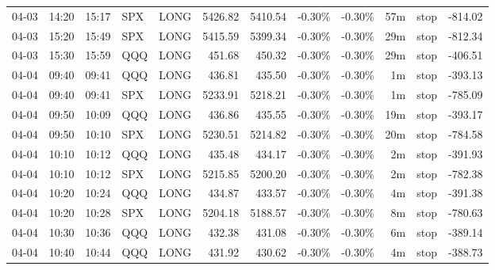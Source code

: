 \documentclass[11pt,a4paper,twoside]{article}
\begin{document}
\begin{center}
\begin{longtable}{>{\color{txtmain}}l l l l l r r r r r >{\color{txtmain}}l r}
04-03 & 14:20 & 15:17 & SPX & LONG & 5426.82 & 5410.54 & \textcolor{lossred}{-0.30\%} & \textcolor{lossred}{-0.30\%} & 57m & stop & \textcolor{lossred}{-814.02} \\
04-03 & 15:20 & 15:49 & SPX & LONG & 5415.59 & 5399.34 & \textcolor{lossred}{-0.30\%} & \textcolor{lossred}{-0.30\%} & 29m & stop & \textcolor{lossred}{-812.34} \\
04-03 & 15:30 & 15:59 & QQQ & LONG & 451.68 & 450.32 & \textcolor{lossred}{-0.30\%} & \textcolor{lossred}{-0.30\%} & 29m & stop & \textcolor{lossred}{-406.51} \\
04-04 & 09:40 & 09:41 & QQQ & LONG & 436.81 & 435.50 & \textcolor{lossred}{-0.30\%} & \textcolor{lossred}{-0.30\%} & 1m & stop & \textcolor{lossred}{-393.13} \\
04-04 & 09:40 & 09:41 & SPX & LONG & 5233.91 & 5218.21 & \textcolor{lossred}{-0.30\%} & \textcolor{lossred}{-0.30\%} & 1m & stop & \textcolor{lossred}{-785.09} \\
04-04 & 09:50 & 10:09 & QQQ & LONG & 436.86 & 435.55 & \textcolor{lossred}{-0.30\%} & \textcolor{lossred}{-0.30\%} & 19m & stop & \textcolor{lossred}{-393.17} \\
04-04 & 09:50 & 10:10 & SPX & LONG & 5230.51 & 5214.82 & \textcolor{lossred}{-0.30\%} & \textcolor{lossred}{-0.30\%} & 20m & stop & \textcolor{lossred}{-784.58} \\
04-04 & 10:10 & 10:12 & QQQ & LONG & 435.48 & 434.17 & \textcolor{lossred}{-0.30\%} & \textcolor{lossred}{-0.30\%} & 2m & stop & \textcolor{lossred}{-391.93} \\
04-04 & 10:10 & 10:12 & SPX & LONG & 5215.85 & 5200.20 & \textcolor{lossred}{-0.30\%} & \textcolor{lossred}{-0.30\%} & 2m & stop & \textcolor{lossred}{-782.38} \\
04-04 & 10:20 & 10:24 & QQQ & LONG & 434.87 & 433.57 & \textcolor{lossred}{-0.30\%} & \textcolor{lossred}{-0.30\%} & 4m & stop & \textcolor{lossred}{-391.38} \\
04-04 & 10:20 & 10:28 & SPX & LONG & 5204.18 & 5188.57 & \textcolor{lossred}{-0.30\%} & \textcolor{lossred}{-0.30\%} & 8m & stop & \textcolor{lossred}{-780.63} \\
04-04 & 10:30 & 10:36 & QQQ & LONG & 432.38 & 431.08 & \textcolor{lossred}{-0.30\%} & \textcolor{lossred}{-0.30\%} & 6m & stop & \textcolor{lossred}{-389.14} \\
04-04 & 10:40 & 10:44 & QQQ & LONG & 431.92 & 430.62 & \textcolor{lossred}{-0.30\%} & \textcolor{lossred}{-0.30\%} & 4m & stop & \textcolor{lossred}{-388.73} \\

\end{longtable}
\end{center}
\end{document}

